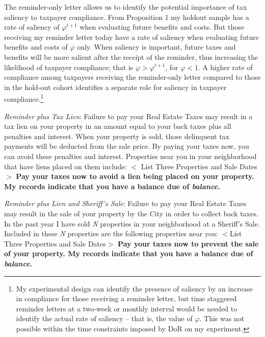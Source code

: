 \bigskip

 The reminder-only letter allows us to identify the potential
 importance of tax saliency to taxpayer compliance.  From Proposition 1 my holdout sample has a rate of saliency of
 $\varphi^{t+1}$ when evaluating future benefits and costs.  But those
 receiving my reminder letter today have a rate of saliency when
 evaluating future benefits and costs of $\varphi$ only.  When
 saliency is important, future taxes and benefits will be more salient
 after the receipt of the reminder, thus increasing the likelihood of
 taxpayer compliance; that is $\varphi>\varphi^{t+1}$, for $\varphi<1$. A higher rate of compliance among taxpayers
 receiving the reminder-only letter compared to those in the hold-out
 cohort identifies a separate role for saliency in taxpayer
 compliance.\footnote{My experimental design can identify the
   presence of saliency by an increase in compliance for those
   receiving a reminder letter, but time staggered reminder letters at
   a two-week or monthly interval would be needed to identify the
   actual rate of saliency -- that is, the value of $\varphi$.  This
   was not possible within the time constraints imposed by DoR on my
   experiment.  }
   
\bigskip

\noindent \textit{Reminder plus Tax Lien}: Failure to pay your Real
Estate Taxes may result in a tax lien on your property in an amount
equal to your back taxes plus all penalties and interest.  When your
property is sold, those delinquent tax payments will be deducted from
the sale price.  By paying your taxes now, you can avoid these
penalties and interest.  Properties near you in your neighborhood that
have liens placed on them include: $<$ List Three Properties and Sale
Dates $>$ \textbf{Pay your taxes now to avoid a lien being placed on
  your property.  My records indicate that you have a balance due of
  \textit{balance}.  }

\bigskip

\noindent \textit{Reminder plus Lien and Sheriff's Sale}: Failure to
pay your Real Estate Taxes may result in the sale of your property by
the City in order to collect back taxes.  In the past year I have
sold \textit{N} properties in your neighborhood at a Sheriff's Sale.
Included in these \textit{N} properties are the following properties
near you: $<$List Three Properties and Sale Dates$>$ \textbf{Pay your
  taxes now to prevent the sale of your property.  My records
  indicate that you have a balance due of \textit{balance}.}

